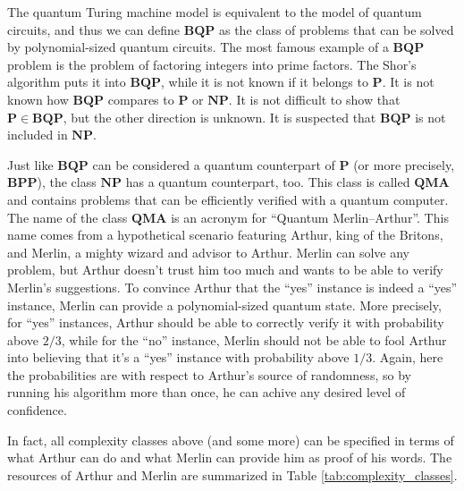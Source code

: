 The quantum Turing machine model is equivalent to the model of quantum circuits, and thus we can define $\mathbf{BQP}$ as the class of problems that can be solved by polynomial-sized quantum circuits. The most famous example of a $\mathbf{BQP}$ problem is the problem of factoring integers into prime factors. The Shor's algorithm \cite{nielsen_quantum_2006} puts it into $\mathbf{BQP}$, while it is not known if it belongs to $\mathbf{P}$. It is not known how $\mathbf{BQP}$ compares to $\mathbf{P}$ or $\mathbf{NP}$. It is not difficult to show that $\mathbf{P} \in \mathbf{BQP}$, but the other direction is unknown. It is suspected that $\mathbf{BQP}$ is not included in $\mathbf{NP}$.

Just like $\mathbf{BQP}$ can be considered a quantum counterpart of $\mathbf{P}$ (or more precisely, $\mathbf{BPP}$), the class $\mathbf{NP}$ has a quantum counterpart, too. This class is called $\mathbf{QMA}$ and contains problems that can be efficiently verified with a quantum computer. The name of the class $\mathbf{QMA}$ is an acronym for ``Quantum Merlin--Arthur''. This name comes from a hypothetical scenario featuring Arthur, king of the Britons, and Merlin, a mighty wizard and advisor to Arthur. Merlin can solve any problem, but Arthur doesn't trust him too much and wants to be able to verify Merlin's suggestions. To convince Arthur that the ``yes'' instance is indeed a ``yes'' instance, Merlin can provide a polynomial-sized quantum state. More precisely, for ``yes'' instances, Arthur should be able to correctly verify it with probability above $2/3$, while for the ``no'' instance, Merlin should not be able to fool Arthur into believing that it's a ``yes'' instance with probability above $1/3$. Again, here the probabilities are with respect to Arthur's source of randomness, so by running his algorithm more than once, he can achive any desired level of confidence.

In fact, all complexity classes above (and some more) can be specified in terms of what Arthur can do and what Merlin can provide him as proof of his words. The resources of Arthur and Merlin are summarized in Table \ref{tab:complexity_classes}.

